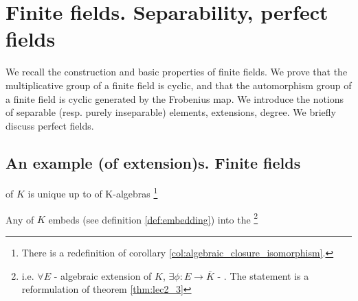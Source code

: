 \chapter{Finite fields. Separability, perfect fields}
We recall the construction and basic properties of finite fields. We
prove that the multiplicative group of a finite field is cyclic, and
that the automorphism group of a finite field is cyclic generated by
the Frobenius map. We introduce the notions of separable (resp. purely
inseparable) elements, extensions, degree. We briefly discuss perfect
fields.

\section{An example (of extension)s. Finite fields}

\begin{corollary}
   of $K$ is unique up to
   of K-algebras
  \footnote{
    There is a redefinition of corollary
    \ref{col:algebraic_closure_isomorphism}.
  }
  \label{col:lec3_1}
\end{corollary}

\begin{corollary}
  Any  of $K$ embeds  (see
  definition \ref{def:embedding}) into the
   \footnote{
    i.e. $\forall E$ - algebraic extension of $K$,
    $\exists \phi: E \to \bar{K}$ - . The
    statement is  a reformulation
    of theorem \ref{thm:lec2_3}}
  \label{col:lec3_2}
\end{corollary}

